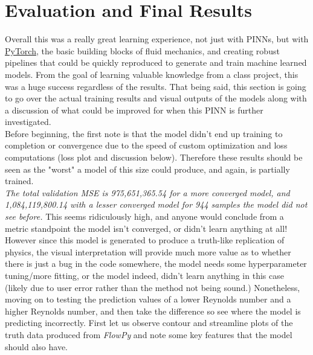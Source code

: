 \documentclass{article}
\begin{document}
    
	\section{Evaluation and Final Results} \label{results}
	
	Overall this was a really great learning experience, not just with PINNs, but with \href{https://pytorch.org/}{PyTorch}, the basic building blocks of fluid mechanics,
	and creating robust pipelines that could be quickly reproduced to generate and train machine learned models. From the goal of learning valuable knowledge from a class project, this was a huge success regardless of the results. That being said, this section is going to go over the actual training results and visual outputs of the models along with a discussion of what could be improved for when this PINN is further investigated.	\\
	
	\noindent Before beginning, the first note is that the model didn't end up training to completion or convergence due to the speed of custom optimization and loss computations (loss plot and discussion below). Therefore these results should be seen as the "worst" a model of this size could produce, and again, is partially trained. \\
	
	\noindent \textit{The total validation MSE is 975,651,365.54 for a more converged model, and 1,084,119,800.14 with a lesser converged model for 944 samples the model did not see before.} This seems ridiculously high, and anyone would conclude from a metric standpoint the model isn't converged, or didn't learn anything at all! However since this model is generated to produce a truth-like replication of physics, the visual interpretation will provide much more value as to whether there is just a bug in the code somewhere, the model needs some hyperparameter tuning/more fitting, or the model indeed, didn't learn anything in this case (likely due to user error rather than the method not being sound.) Nonetheless, moving on to testing the prediction values of a lower Reynolds number and a higher Reynolds number, and then take the difference so see where the model is predicting incorrectly. First let us observe contour and streamline plots of the truth data produced from \textit{FlowPy} and note some key features that the model should also have.
	
\end{document}
